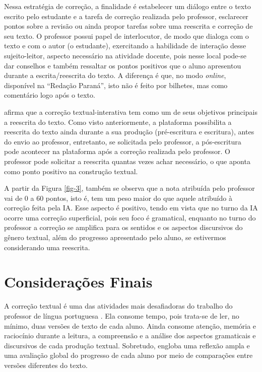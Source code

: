 \documentclass[portuguese]{textolivre}
\begin{document}
Nessa estratégia de correção, a finalidade é estabelecer um diálogo entre o texto escrito pelo estudante e a tarefa de correção realizada pelo professor, esclarecer pontos sobre a revisão ou ainda propor tarefas sobre uma reescrita e correção de seu texto. O professor possui papel de interlocutor, de modo que dialoga com o texto e com o autor (o estudante), exercitando a habilidade de interação desse sujeito-leitor, aspecto necessário na atividade docente, pois nesse local pode-se dar conselhos e também ressaltar os pontos positivos que o aluno apresentou durante a escrita/reescrita do texto. A diferença é que, no modo \textit{online}, disponível na ``Redação Paraná'', isto não é feito por bilhetes, mas como comentário logo após o texto.


\textcite{ruiz2015} afirma que a correção textual-interativa tem como um de seus objetivos principais a reescrita do texto. Como visto anteriormente, a plataforma possibilita a reescrita do texto ainda durante a sua produção (pré-escritura e escritura), antes do envio ao professor, entretanto, se solicitada pelo professor, a pós-escritura pode acontecer na plataforma após a correção realizada pelo professor. O professor pode solicitar a reescrita quantas vezes achar necessário, o que \textcite{conceicao2004} aponta como ponto positivo na construção textual.

A partir da Figura \ref{fig-3}, também se observa que a nota atribuída pelo professor vai de 0 a 60 pontos, isto é, tem um peso maior do que aquele atribuído à correção feita pela IA. Esse aspecto é positivo, tendo em vista que no turno da IA ocorre uma correção superficial, pois seu foco é gramatical, enquanto no turno do professor a correção se amplifica para os sentidos e os aspectos discursivos do gênero textual, além do progresso apresentado pelo aluno, se estivermos considerando uma reescrita.

\section{Considerações Finais}
A correção textual é uma das atividades mais desafiadoras do trabalho do professor de língua portuguesa \cite{conceicao2004}. Ela consome tempo, pois trata-se de ler, no mínimo, duas versões de texto de cada aluno. Ainda consome atenção, memória e raciocínio durante a leitura, a compreensão e a análise dos aspectos gramaticais e discursivos de cada produção textual. Sobretudo, engloba uma reflexão ampla e uma avaliação global do progresso de cada aluno por meio de comparações entre versões diferentes do texto.
\end{document}
